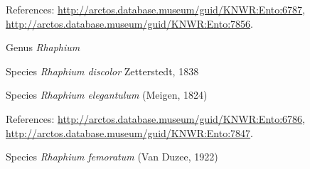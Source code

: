 \documentclass[9pt, article]{memoir}
\begin{document}
\begin{multicols}{2}
\vspace{6pt}References: 
\url{http://arctos.database.museum/guid/KNWR:Ento:6787}, 
\url{http://arctos.database.museum/guid/KNWR:Ento:7856}.

\vspace{6pt}\noindent\hspace{30pt}Genus \textit{Rhaphium}


\vspace{6pt}\noindent\hspace{36pt}Species \textit{Rhaphium discolor} Zetterstedt, 1838


\vspace{6pt}\noindent\hspace{36pt}Species \textit{Rhaphium elegantulum} (Meigen, 1824)


\vspace{6pt}References: 
\url{http://arctos.database.museum/guid/KNWR:Ento:6786}, 
\url{http://arctos.database.museum/guid/KNWR:Ento:7847}.

\vspace{6pt}\noindent\hspace{36pt}Species \textit{Rhaphium femoratum} (Van Duzee, 1922)



\end{multicols}
\end{document}
